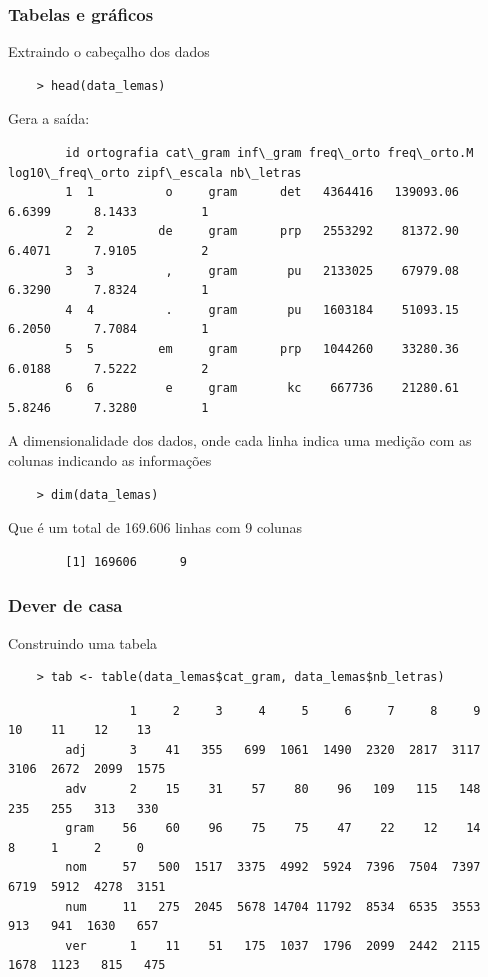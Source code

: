 \documentclass[14pt]{beamer}
\begin{document}
\begin{frame}[t,fragile=singleslide]
\frametitle{Tabelas e gráficos}
	Extraindo o cabeçalho dos dados
	\begin{lstlisting}
	> head(data_lemas)
	\end{lstlisting}
	Gera a saída:
	\begin{addmargin}[2.45cm]{0em}
		\normalsize 
		\begin{verbatim}
		id ortografia cat\_gram inf\_gram freq\_orto freq\_orto.M log10\_freq\_orto zipf\_escala nb\_letras
		1  1          o     gram      det   4364416   139093.06          6.6399      8.1433         1
		2  2         de     gram      prp   2553292    81372.90          6.4071      7.9105         2
		3  3          ,     gram       pu   2133025    67979.08          6.3290      7.8324         1
		4  4          .     gram       pu   1603184    51093.15          6.2050      7.7084         1
		5  5         em     gram      prp   1044260    33280.36          6.0188      7.5222         2
		6  6          e     gram       kc    667736    21280.61          5.8246      7.3280         1
		\end{verbatim}
	\end{addmargin}
	A dimensionalidade dos dados, onde cada linha indica uma medição com as colunas indicando as informações\\
	\begin{lstlisting}
	> dim(data_lemas)
	\end{lstlisting}
	Que é um total de 169.606 linhas com 9 colunas
	\begin{addmargin}[2cm]{0em}
	\normalsize 
	\begin{verbatim}
		[1] 169606      9
	\end{verbatim}
	\end{addmargin}

\end{frame}
\begin{frame}[t,fragile=singleslide]
	\frametitle{Dever de casa}
	Construindo uma tabela
	\begin{lstlisting}
	> tab <- table(data_lemas$cat_gram, data_lemas$nb_letras)
	\end{lstlisting}
	\vspace{2.0cm}

	\begin{addmargin}[2cm]{0em}
		\normalsize 
		\begin{verbatim}
		         1     2     3     4     5     6     7     8     9    10    11    12    13
		adj      3    41   355   699  1061  1490  2320  2817  3117  3106  2672  2099  1575
		adv      2    15    31    57    80    96   109   115   148   235   255   313   330
		gram    56    60    96    75    75    47    22    12    14     8     1     2     0
		nom     57   500  1517  3375  4992  5924  7396  7504  7397  6719  5912  4278  3151
		num     11   275  2045  5678 14704 11792  8534  6535  3553   913   941  1630   657
		ver      1    11    51   175  1037  1796  2099  2442  2115  1678  1123   815   475
		\end{verbatim}
	\end{addmargin}
	
\end{frame}
\end{document}
